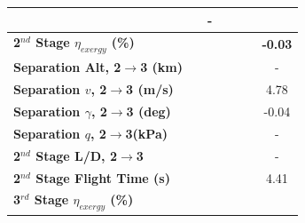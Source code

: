 \begin{table}
\begin{tabular}{l c c c c c c}
	& \firstsecondSeparationgammamFuelOneHundredTenNoReturn
	& -
	\\
	\hline 
	\textbf{2$^{nd}$ Stage $\eta_{exergy}$ (\%)}
	& \textbf{\secondExergyEffmFuelNinetyNoReturn}
	& \textbf{\secondExergyEffmFuelNinetyFiveNoReturn}
	& \textbf{\secondExergyEffmFuelStandardNoReturn}
	& \textbf{\secondExergyEffmFuelOneHundredFiveNoReturn}
	& \textbf{\secondExergyEffmFuelOneHundredTenNoReturn}
	& \textbf{-0.03}
	\\
	\textbf{Separation Alt, 2$\rightarrow$3 (km)}
	& \secondthirdSeparationAltmFuelNinetyNoReturn
	& \secondthirdSeparationAltmFuelNinetyFiveNoReturn
	& \secondthirdSeparationAltmFuelStandardNoReturn
	& \secondthirdSeparationAltmFuelOneHundredFiveNoReturn
	& \secondthirdSeparationAltmFuelOneHundredTenNoReturn
	& -
	\\
	\textbf{Separation $v$, 2$\rightarrow$3 (m/s)}
	& \secondthirdSeparationvmFuelNinetyNoReturn
	& \secondthirdSeparationvmFuelNinetyFiveNoReturn
	& \secondthirdSeparationvmFuelStandardNoReturn
	& \secondthirdSeparationvmFuelOneHundredFiveNoReturn
	& \secondthirdSeparationvmFuelOneHundredTenNoReturn
	&4.78
	\\
	\textbf{Separation $\gamma$, 2$\rightarrow$3 (deg)}
	& \secondthirdSeparationgammamFuelNinetyNoReturn
	& \secondthirdSeparationgammamFuelNinetyFiveNoReturn
	& \secondthirdSeparationgammamFuelStandardNoReturn
	& \secondthirdSeparationgammamFuelOneHundredFiveNoReturn
	& \secondthirdSeparationgammamFuelOneHundredTenNoReturn
	&-0.04
	\\
	\textbf{Separation $q$, 2$\rightarrow$3(kPa)}
	& \secondthirdSeparationqmFuelNinetyNoReturn
	& \secondthirdSeparationqmFuelNinetyFiveNoReturn
	& \secondthirdSeparationqmFuelStandardNoReturn
	& \secondthirdSeparationqmFuelOneHundredFiveNoReturn
	& \secondthirdSeparationqmFuelOneHundredTenNoReturn
	& -
	\\
	\textbf{2$^{nd}$ Stage L/D, 2$\rightarrow$3}
	& \secondthirdSeparationLDmFuelNinetyNoReturn
	& \secondthirdSeparationLDmFuelNinetyFiveNoReturn
	& \secondthirdSeparationLDmFuelStandardNoReturn
	& \secondthirdSeparationLDmFuelOneHundredFiveNoReturn
	& \secondthirdSeparationLDmFuelOneHundredTenNoReturn
	& -
	\\
	\textbf{2$^{nd}$ Stage Flight Time (s)}
	& \secondFlightTimemFuelNinetyNoReturn
	& \secondFlightTimemFuelNinetyFiveNoReturn
	& \secondFlightTimemFuelStandardNoReturn
	& \secondFlightTimemFuelOneHundredFiveNoReturn
	& \secondFlightTimemFuelOneHundredTenNoReturn
	&4.41
	\\
	\hline 
	\textbf{3$^{rd}$ Stage $\eta_{exergy}$ (\%)}

\end{tabular}
\end{table}
